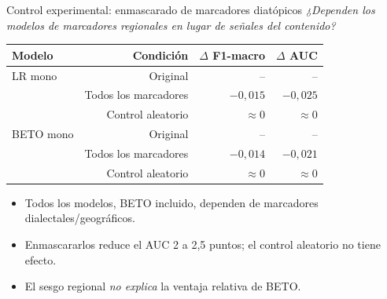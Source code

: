 ﻿\documentclass[11pt,aspectratio=169]{beamer}
\newcommand{\ugrsubtitle}[1]{%
  \vskip-0.25cm
  \small\textcolor{ugrGris}{\emph{#1}}\par
  \vskip0.15cm
}
\newcommand{\ugrblock}[2]{
  \begin{tcolorbox}[
    enhanced, colback=ugrFondoClaro, colframe=ugrAzul, boxrule=0.8pt, arc=3pt,
    title={\textbf{#1}}, fonttitle=\small\bfseries, coltitle=white, colbacktitle=ugrAzul,
    left=6pt, right=6pt, top=2pt, bottom=2pt, before skip=0.3em, after skip=0.2em
  ]
    #2
  \end{tcolorbox}
}
\begin{document}
\begin{frame}{Control experimental: enmascarado de marcadores diatópicos}
  \small
  \ugrsubtitle{¿Dependen los modelos de marcadores regionales en lugar de señales del contenido?}
  \begin{table}
    \centering\scriptsize
    \setlength{\tabcolsep}{4pt}
    \begin{tabular}{lrrr}
      \toprule
      \textbf{Modelo} & \textbf{Condición} & $\Delta$ F1-macro & $\Delta$ AUC \\
      \midrule
      LR mono & Original & -- & -- \\
      & Todos los marcadores & $-0{,}015$ & $-0{,}025$ \\
      & Control aleatorio & $\approx 0$ & $\approx 0$ \\
      \midrule
      BETO mono & Original & -- & -- \\
      & Todos los marcadores & $-0{,}014$ & $-0{,}021$ \\
      & Control aleatorio & $\approx 0$ & $\approx 0$ \\
      \bottomrule
    \end{tabular}
  \end{table}
  \ugrblock{Conclusiones}{
    \begin{itemize}
      \item Todos los modelos, BETO incluido, dependen de marcadores dialectales/geográficos.
      \item Enmascararlos reduce el AUC 2 a 2{,}5 puntos; el control aleatorio no tiene efecto.
      \item El sesgo regional \emph{no explica} la ventaja relativa de BETO.
    \end{itemize}
  }
\end{frame}
\end{document}
